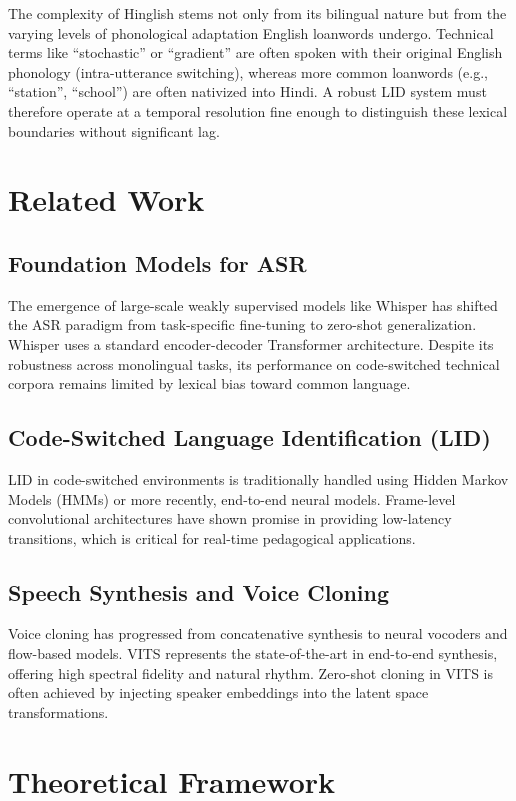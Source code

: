 \documentclass[10pt,twocolumn,letterpaper]{article}
\begin{document}
The complexity of Hinglish stems not only from its bilingual nature but
from the varying levels of phonological adaptation English loanwords undergo.
Technical terms like ``stochastic'' or ``gradient'' are often spoken with
their original English phonology (intra-utterance switching), whereas
more common loanwords (e.g., ``station'', ``school'') are often
nativized into Hindi. A robust LID system must therefore operate at a
temporal resolution fine enough to distinguish these lexical boundaries
without significant lag.

\section{Related Work}

\subsection{Foundation Models for ASR}
The emergence of large-scale weakly supervised models like Whisper
\cite{radford2022} has shifted the ASR paradigm from task-specific
fine-tuning to zero-shot generalization. Whisper uses a standard
encoder-decoder Transformer architecture. Despite its robustness across
monolingual tasks, its performance on code-switched technical corpora
remains limited by lexical bias toward common language.

\subsection{Code-Switched Language Identification (LID)}
LID in code-switched environments is traditionally handled using Hidden
Markov Models (HMMs) or more recently, end-to-end neural models.
Frame-level convolutional architectures have shown promise in providing
low-latency transitions, which is critical for real-time pedagogical
applications.

\subsection{Speech Synthesis and Voice Cloning}
Voice cloning has progressed from concatenative synthesis to neural
vocoders and flow-based models. VITS \cite{kim2021} represents the
state-of-the-art in end-to-end synthesis, offering high spectral
fidelity and natural rhythm. Zero-shot cloning in VITS is often achieved
by injecting speaker embeddings into the latent space transformations.

\section{Theoretical Framework}
\end{document}
